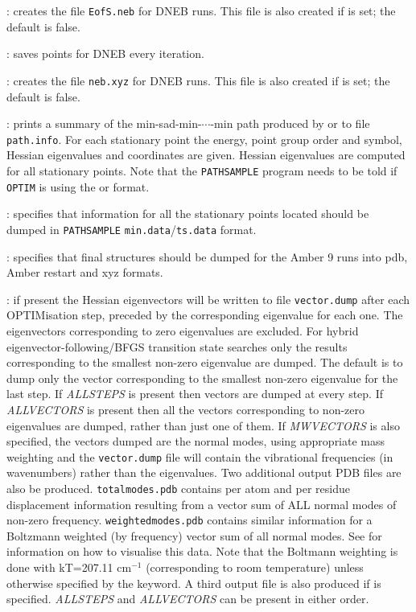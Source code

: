 {{: creates the file {\tt EofS.neb} for DNEB runs. This file is
also created if {} is set; the default is false.

: saves points for DNEB every iteration.

: creates the file {\tt neb.xyz} for DNEB runs. This file is
also created if {} is set; the default is false.

: prints a summary of the min-sad-min-$\cdots$-min path produced by {} 
or  to
file {\tt path.info}. For each stationary point the energy, point group order and symbol, 
Hessian eigenvalues and coordinates are given. Hessian eigenvalues are computed
for all stationary points.
Note that the {\tt PATHSAMPLE} program needs to be told if {\tt OPTIM} is using
the {} or {} format.

: specifies that information for all the stationary points located
should be dumped in 
{\tt PATHSAMPLE} {\tt min.data}/{\tt ts.data} format.

: specifies that final structures should be dumped for the Amber 9 
runs into pdb, Amber restart and xyz formats.

: if present the Hessian eigenvectors 
will be written to file {\tt vector.dump} after each OPTIMisation step,
preceded by the corresponding eigenvalue for each one. The
eigenvectors corresponding to zero eigenvalues are excluded. For hybrid eigenvector-following/BFGS
transition state searches only the results corresponding to the smallest non-zero
eigenvalue are dumped. The default is to dump only the vector corresponding
to the smallest non-zero eigenvalue for the last step. If {\it ALLSTEPS\/} is
present then vectors are dumped at every step. If {\it ALLVECTORS\/} is present
then all the vectors corresponding to non-zero eigenvalues are dumped, rather
than just one of them. If {\it MWVECTORS\/} is also specified, the vectors dumped are the normal modes, 
using appropriate mass weighting and the {\tt vector.dump} file will contain the vibrational frequencies (in wavenumbers) rather than the eigenvalues. Two additional output PDB files are also be produced. {\tt totalmodes.pdb} contains per atom and per residue displacement information resulting from a vector sum of ALL normal modes of non-zero frequency. {\tt weightedmodes.pdb} contains similar information for a Boltzmann weighted (by frequency) vector sum of all normal modes. See {} for information on how to visualise this data. Note that the Boltmann weighting is done with kT=207.11 cm$^{-1}$ (corresponding to room temperature) unless otherwise specified by the {} keyword. A third output file is also produced if {} is specified. {\it ALLSTEPS\/} and {\it ALLVECTORS\/} can be present in
either order. 




}}
